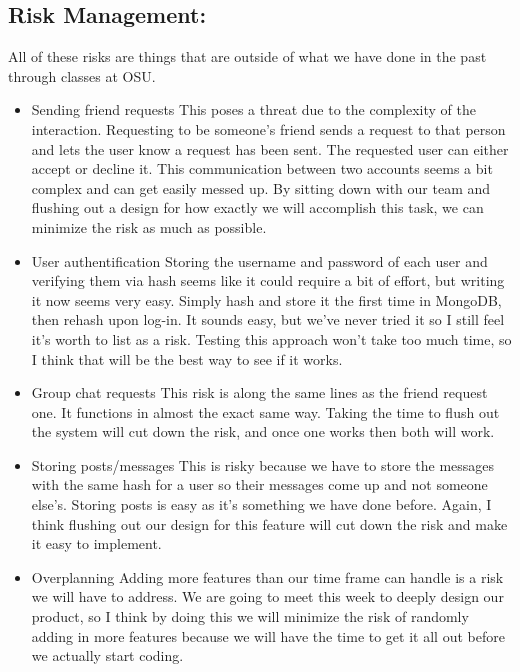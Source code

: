 \documentclass[a4paper]{article}
\begin{document}
\begin{flushleft}
\subsection{Risk Management:}
All of these risks are things that are outside of what we have done in the past through classes at OSU.
\begin{itemize}
\item Sending friend requests
This poses a threat due to the complexity of the interaction. Requesting to be someone’s friend sends a request to that person and lets the user know a request has been sent. The requested user can either accept or decline it. This communication between two accounts seems a bit complex and can get easily messed up. By sitting down with our team and flushing out a design for how exactly we will accomplish this task, we can minimize the risk as much as possible.
\item User authentification
Storing the username and password of each user and verifying them via hash seems like it could require a bit of effort, but writing it now seems very easy. Simply hash and store it the first time in MongoDB, then rehash upon log-in. It sounds easy, but we’ve never tried it so I still feel it’s worth to list as a risk. Testing this approach won’t take too much time, so I think that will be the best way to see if it works. 
\item Group chat requests
This risk is along the same lines as the friend request one. It functions in almost the exact same way. Taking the time to flush out the system will cut down the risk, and once one works then both will work.
\item Storing posts/messages
This is risky because we have to store the messages with the same hash for a user so their messages come up and not someone else’s. Storing posts is easy as it’s something we have done before. Again, I think flushing out our design for this feature will cut down the risk and make it easy to implement.
\item Overplanning
Adding more features than our time frame can handle is a risk we will have to address. We are going to meet this week to deeply design our product, so I think by doing this we will minimize the risk of randomly adding in more features because we will have the time to get it all out before we actually start coding.
\end{itemize}
\end{flushleft}
\end{document}

